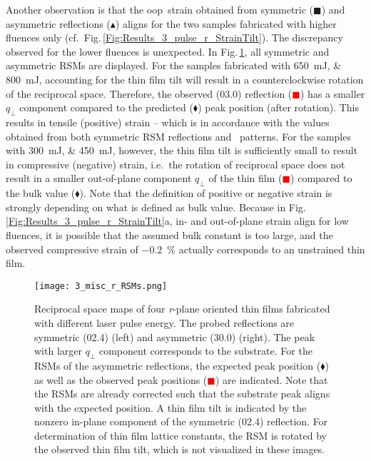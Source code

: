 {\sloppy %
Another observation is that the \gls{oop}\ strain obtained from symmetric (\textcolor{col-brightOrange}{$\blacksquare$}) and asymmetric reflections (\textcolor{col-brightGreen}{$\blacktriangle$}) aligns for the two samples fabricated with higher fluences only (cf.\ Fig.\,\ref{Fig:Results_3_pulse_r_StrainTilt}).
The discrepancy observed for the lower fluences is unexpected.
In Fig.\,\ref{Fig:Res_3_RSMs_r}, all symmetric and asymmetric RSMs are displayed.
For the samples fabricated with \qtylist{650;800}{\milli\J}, accounting for the thin film tilt will result in a counterclockwise rotation of the reciprocal space.
Therefore, the observed (03.0) reflection (\textcolor{red}{$\blacksquare$}) has a smaller $q_\perp$ component compared to the predicted ($\blacklozenge$) peak position (after rotation).
This results in tensile (positive) strain -- which is in accordance with the values obtained from both symmetric RSM reflections and \thetaomega\ patterns.
For the samples with \qtylist{300;450}{\milli\J}, however, the thin film tilt is sufficiently small to result in compressive (negative) strain, i.e.\ the rotation of reciprocal space does not result in a smaller out-of-plane component $q_\perp$ of the thin film (\textcolor{red}{$\blacksquare$}) compared to the bulk value ($\blacklozenge$).
Note that the definition of positive or negative strain is strongly depending on what is defined as bulk value.
Because in Fig.\,\ref{Fig:Results_3_pulse_r_StrainTilt}a, in- and out-of-plane strain align for low fluences, it is possible that the assumed bulk constant is too large, and the observed compressive strain of \qty{-0.2}{\percent} actually corresponds to an unstrained thin film.
% 
\par}
\begin{figure}
    \centering
    \texttt{[image: 3\_misc\_r\_RSMs.png]}
    \caption{
        Reciprocal space maps of four \textit{r}-plane oriented thin films fabricated with different laser pulse energy.
        The probed reflections are symmetric (02.4) (left) and asymmetric (30.0) (right).
        The peak with larger $q_\perp$ component corresponds to the substrate.
        For the RSMs of the asymmetric reflections, the expected peak position ($\blacklozenge$) as well as the observed peak positions (\textcolor{red}{$\blacksquare$}) are indicated.
        Note that the RSMs are already corrected such that the substrate peak aligns with the expected position.
        A thin film tilt is indicated by the nonzero in-plane component of the symmetric (02.4) reflection.
        For determination of thin film lattice constants, the RSM is rotated by the observed thin film tilt, which is not visualized in these images.
    }
    \label{Fig:Res_3_RSMs_r}
\end{figure}


